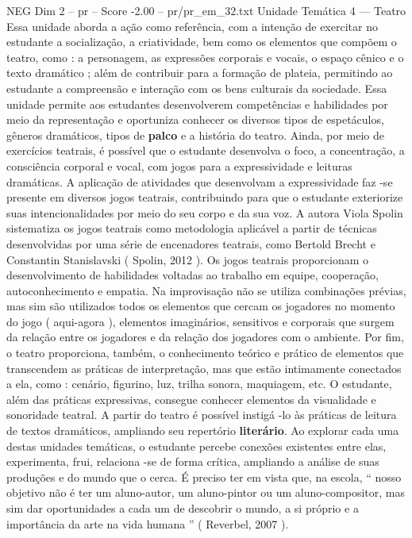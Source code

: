 \begin{textsample}{NEG Dim 2 – pr – Score -2.00 – pr/pr\_em\_32.txt}  \label{ex:f2_neg_173}
Unidade Temática 4 — Teatro Essa unidade aborda a ação como referência, com a intenção de exercitar no estudante a socialização, a criatividade, bem como os elementos que compõem o teatro, como : a personagem, as expressões corporais e vocais, o espaço cênico e o texto dramático ; além de contribuir para a formação de plateia, permitindo ao estudante a compreensão e interação com os bens culturais da sociedade.
Essa unidade permite aos estudantes desenvolverem competências e habilidades por meio da representação e oportuniza conhecer os diversos tipos de espetáculos, gêneros dramáticos, tipos de \textbf{palco} e a história do teatro.
Ainda, por meio de exercícios teatrais, é possível que o estudante desenvolva o foco, a concentração, a consciência corporal e vocal, com jogos para a expressividade e leituras dramáticas.
A aplicação de atividades que desenvolvam a expressividade faz -se presente em diversos jogos teatrais, contribuindo para que o estudante exteriorize suas intencionalidades por meio do seu corpo e da sua voz.
A autora Viola Spolin sistematiza os jogos teatrais como metodologia aplicável a partir de técnicas desenvolvidas por uma série de encenadores teatrais, como Bertold Brecht e Constantin Stanislavski ( Spolin, 2012 ).
Os jogos teatrais proporcionam o desenvolvimento de habilidades voltadas ao trabalho em equipe, cooperação, autoconhecimento e empatia.
Na improvisação não se utiliza combinações prévias, mas sim são utilizados todos os elementos que cercam os jogadores no momento do jogo ( aqui-agora ), elementos imaginários, sensitivos e corporais que surgem da relação entre os jogadores e da relação dos jogadores com o ambiente.
Por fim, o teatro proporciona, também, o conhecimento teórico e prático de elementos que transcendem as práticas de interpretação, mas que estão intimamente conectados a ela, como : cenário, figurino, luz, trilha sonora, maquiagem, etc.
O estudante, além das práticas expressivas, consegue conhecer elementos da visualidade e sonoridade teatral.
A partir do teatro é possível instigá -lo às práticas de leitura de textos dramáticos, ampliando seu repertório \textbf{literário}.
Ao explorar cada uma destas unidades temáticas, o estudante percebe conexões existentes entre elas, experimenta, frui, relaciona -se de forma crítica, ampliando a análise de suas produções e do mundo que o cerca.
É preciso ter em vista que, na escola, “ nosso objetivo não é ter um aluno-autor, um aluno-pintor ou um aluno-compositor, mas sim dar oportunidades a cada um de descobrir o mundo, a si próprio e a importância da arte na vida humana ” ( Reverbel, 2007 ).

\end{textsample}
